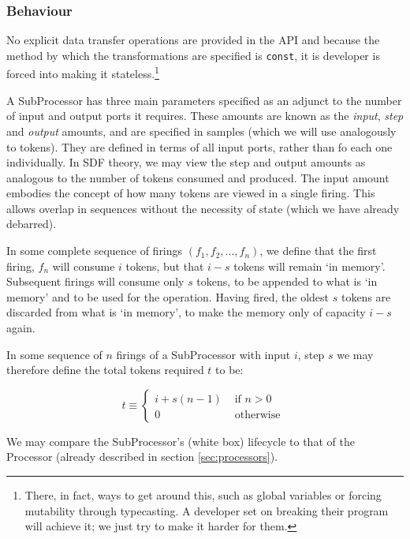 \subsubsection{Behaviour}

No explicit data transfer operations are provided in the API and because the method by which the transformations are specified is \texttt{const}, it is developer is forced into making it stateless.\footnote{There, in fact, ways to get around this, such as global variables or forcing mutability through typecasting. A developer set on breaking their program will achieve it; we just try to make it harder for them.}

A SubProcessor has three main parameters specified as an adjunct to the number of input and output ports it requires. These amounts are known as the \textit{input}, \textit{step} and \textit{output} amounts, and are specified in samples (which we will use analogously to tokens). They are defined in terms of all input ports, rather than fo each one individually. In SDF theory, we may view the step and output amounts as analogous to the number of tokens consumed and produced. The input amount embodies the concept of how many tokens are viewed in a single firing. This allows overlap in sequences without the necessity of state (which we have already debarred).

In some complete sequence of firings $(f_1,f_2,...,f_n)$, we define that the first firing, $f_n$ will consume $i$ tokens, but that $i-s$ tokens will remain `in memory'. Subsequent firings will consume only $s$ tokens, to be appended to what is `in memory' and to be used for the operation. Having fired, the oldest $s$ tokens are discarded from what is `in memory', to make the memory only of capacity $i-s$ again.

In some sequence of $n$ firings of a SubProcessor with input $i$, step $s$ we may therefore define the total tokens required $t$ to be:

\begin{equation}\label{eqn:totaltokens}
t \equiv \begin{cases}
i + s(n - 1) & \text{ if } n > 0 \\
0 & \text{ otherwise }
\end{cases}
\end{equation}

We may compare the SubProcessor's (white box) lifecycle to that of the Processor (already described in section \ref{sec:processors}).

